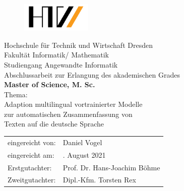 \begin{titlepage}

\begin{figure}[t]
 \centering
 \includegraphics[width=0.3\textwidth]{./source/images/htwdresden.png}
\end{figure}

\begin{center}
\large{Hochschule für Technik und Wirtschaft Dresden} \\[1ex]
\large{Fakultät Informatik/ Mathematik} \\[1ex]
\large{Studiengang Angewandte Informatik} \\[10ex]
\Large{Abschlussarbeit zur Erlangung des akademischen Grades} \\[2ex]
\LARGE{\textbf{Master of Science, M. Sc.}} \\[8ex]
\Large{Thema:} \\[1ex]
\Large{Adaption multilingual vortrainierter Modelle} \\[1ex]
\Large{zur automatischen Zusammenfassung von} \\[1ex]
\Large{Texten auf die deutsche Sprache} \\[10ex]
\end{center}

\begin{flushleft}
\begin{tabular}{ll}
eingereicht von: & \quad Daniel Vogel \\[2ex]
eingereicht am: & \quad 8. August 2021 \\[2ex]
Erstgutachter:  & \quad Prof. Dr. Hans-Joachim Böhme \\[2ex]
Zweitgutachter: & \quad Dipl.-Kfm. Torsten Rex \\[2ex]
\end{tabular}
\end{flushleft}

\end{titlepage}
